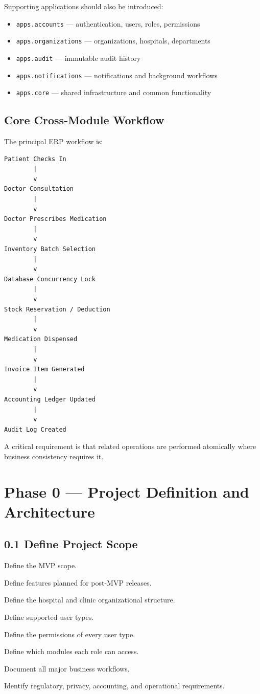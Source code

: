 \documentclass[11pt,a4paper]{article}
\newcommand{\task}[1]{\item[$\square$] #1}
\begin{document}
Supporting applications should also be introduced:

\begin{itemize}
    \item \texttt{apps.accounts} --- authentication, users, roles, permissions
    \item \texttt{apps.organizations} --- organizations, hospitals, departments
    \item \texttt{apps.audit} --- immutable audit history
    \item \texttt{apps.notifications} --- notifications and background workflows
    \item \texttt{apps.core} --- shared infrastructure and common functionality
\end{itemize}

\subsection{Core Cross-Module Workflow}

The principal ERP workflow is:

\begin{lstlisting}
Patient Checks In
        |
        v
Doctor Consultation
        |
        v
Doctor Prescribes Medication
        |
        v
Inventory Batch Selection
        |
        v
Database Concurrency Lock
        |
        v
Stock Reservation / Deduction
        |
        v
Medication Dispensed
        |
        v
Invoice Item Generated
        |
        v
Accounting Ledger Updated
        |
        v
Audit Log Created
\end{lstlisting}

A critical requirement is that related operations are performed atomically
where business consistency requires it.

\section{Phase 0 --- Project Definition and Architecture}

\subsection{0.1 Define Project Scope}

\task{Define the MVP scope.}
\task{Define features planned for post-MVP releases.}
\task{Define the hospital and clinic organizational structure.}
\task{Define supported user types.}
\task{Define the permissions of every user type.}
\task{Define which modules each role can access.}
\task{Document all major business workflows.}
\task{Identify regulatory, privacy, accounting, and operational requirements.}
\end{document}
